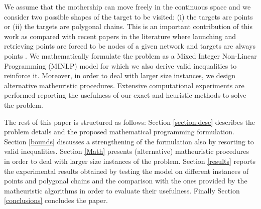 We assume that the mothership can move freely in the continuous space and we consider two possible shapes of the target to be visited: (i) the targets are points or (ii) the targets are polygonal chains. This is an important contribution of this work as compared with recent papers in the literature where launching and retrieving points are forced to be nodes of a given network and targets are always points \cite{art:Cavani2021,art:***, art:**}.
We mathematically formulate the problem as a Mixed Integer Non-Linear Programming (MINLP) model for which we also derive valid inequalities to reinforce it.
Moreover, in order to deal with larger size instances, we design alternative matheuristic procedures. Extensive computational experiments are performed reporting the usefulness of our exact and heuristic methods to solve the problem.

The rest of this paper is structured as follows: Section \ref{section:desc} describes the problem details and the proposed mathematical programming formulation. Section \ref{bounds} discusses a strengthening of the formulation also by resorting to valid inequalities. Section \ref{Math} presents (alternative) matheuristic procedures in order to deal with larger size instances of the problem. Section \ref{results} reports the experimental results obtained by testing the model on different instances of points and polygonal chains and the comparison with the ones provided by the matheuristic algorithms in order to evaluate their usefulness. Finally Section \ref{conclusions} concludes the paper.





